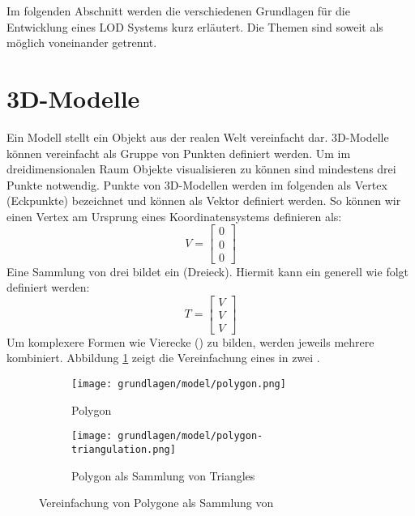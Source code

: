 
Im folgenden Abschnitt werden die verschiedenen Grundlagen für die Entwicklung eines LOD Systems kurz erläutert. Die Themen sind soweit als möglich voneinander getrennt.

\section{3D-Modelle}
Ein Modell stellt ein Objekt aus der realen Welt vereinfacht dar.
3D-Modelle können vereinfacht als Gruppe von Punkten definiert werden.
Um im dreidimensionalen Raum Objekte visualisieren zu können sind mindestens drei Punkte notwendig.
Punkte von 3D-Modellen werden im folgenden als Vertex (Eckpunkte) bezeichnet und können als Vektor definiert werden.
So können wir einen Vertex am Ursprung eines Koordinatensystems definieren als:
$$ V =
\begin{bmatrix}
  0 \\
  0 \\
  0
\end{bmatrix}
$$
Eine Sammlung von drei  bildet ein  (Dreieck). Hiermit kann ein  generell wie folgt definiert werden:
$$ T =
\begin{bmatrix}
  V \\
  V \\
  V
\end{bmatrix}
$$
Um komplexere Formen wie Vierecke () zu bilden, werden jeweils mehrere  kombiniert. Abbildung \ref{fig:modelSimpleTriangulation} zeigt die Vereinfachung eines  in zwei .
\begin{figure}[H]
  \centering
  \begin{subfigure}{.5\textwidth}
    \centering
    \texttt{[image: grundlagen/model/polygon.png]}
    \caption{Polygon}
  \end{subfigure}%
  \begin{subfigure}{.5\textwidth}
    \centering
    \texttt{[image: grundlagen/model/polygon-triangulation.png]}
    \caption{Polygon als Sammlung von Triangles}
  \end{subfigure}
  \caption{Vereinfachung von Polygone als Sammlung von }
  \label{fig:modelSimpleTriangulation}
\end{figure}

